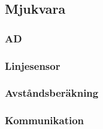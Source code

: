 \subsection{Mjukvara}

\subsubsection{AD}

\subsubsection{Linjesensor}


\subsubsection{Avståndsberäkning}


\subsubsection{Kommunikation}

